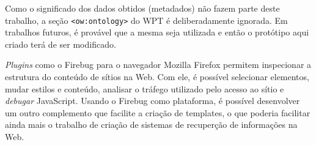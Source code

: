 Como o significado dos dados obtidos (metadados) não fazem parte deste trabalho, a seção \texttt{<ow:ontology>} do WPT é deliberadamente ignorada. Em trabalhos futuros, é provável que a mesma seja utilizada e então o protótipo aqui criado terá de ser modificado. 

\emph{Plugins} como o Firebug \cite{firebug} para o navegador Mozilla Firefox permitem inspecionar a estrutura do conteúdo de sítios na Web. Com ele, é possível selecionar elementos, mudar estilos e conteúdo, analisar o tráfego utilizado pelo acesso ao sítio e \emph{debugar} JavaScript. Usando o Firebug como plataforma, é possível desenvolver um outro complemento que facilite a criação de templates, o que poderia facilitar ainda mais o trabalho de criação de sistemas de recuperção de informações na Web.